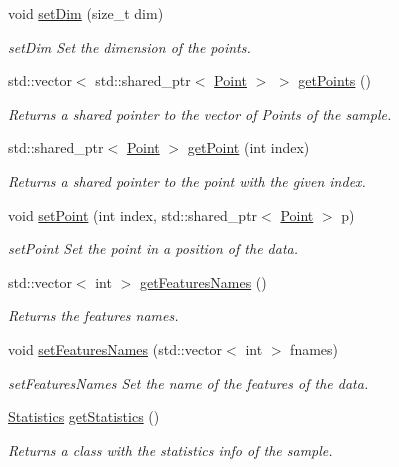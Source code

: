 \begin{DoxyCompactItemize}
void \hyperlink{class_data_a940307fd855d626c6f18573b3eaf7009}{set\+Dim} (size\+\_\+t dim)
\begin{DoxyCompactList}\small\item\em set\+Dim Set the dimension of the points. \end{DoxyCompactList}\item 
std\+::vector$<$ std\+::shared\+\_\+ptr$<$ \hyperlink{class_point}{Point} $>$ $>$ \hyperlink{class_data_a9310e45321bca4335b8ab3031d343e16}{get\+Points} ()
\begin{DoxyCompactList}\small\item\em Returns a shared pointer to the vector of Points of the sample. \end{DoxyCompactList}\item 
std\+::shared\+\_\+ptr$<$ \hyperlink{class_point}{Point} $>$ \hyperlink{class_data_abd978f3708d705e972dc458b6e3fe791}{get\+Point} (int index)
\begin{DoxyCompactList}\small\item\em Returns a shared pointer to the point with the given index. \end{DoxyCompactList}\item 
void \hyperlink{class_data_ad1f5969b33170e908334bd1ad6163b54}{set\+Point} (int index, std\+::shared\+\_\+ptr$<$ \hyperlink{class_point}{Point} $>$ p)
\begin{DoxyCompactList}\small\item\em set\+Point Set the point in a position of the data. \end{DoxyCompactList}\item 
std\+::vector$<$ int $>$ \hyperlink{class_data_a2f6399baee6535e7f48250da54fbf00d}{get\+Features\+Names} ()
\begin{DoxyCompactList}\small\item\em Returns the features names. \end{DoxyCompactList}\item 
void \hyperlink{class_data_a2702b6464d7299c3b62e4eb4390fecd6}{set\+Features\+Names} (std\+::vector$<$ int $>$ fnames)
\begin{DoxyCompactList}\small\item\em set\+Features\+Names Set the name of the features of the data. \end{DoxyCompactList}\item 
\hyperlink{class_statistics}{Statistics} \hyperlink{class_data_a26376768a100f1999ef3ac15a2aa2a67}{get\+Statistics} ()
\begin{DoxyCompactList}\small\item\em Returns a class with the statistics info of the sample. \end{DoxyCompactList}\item 

\end{DoxyCompactItemize}
